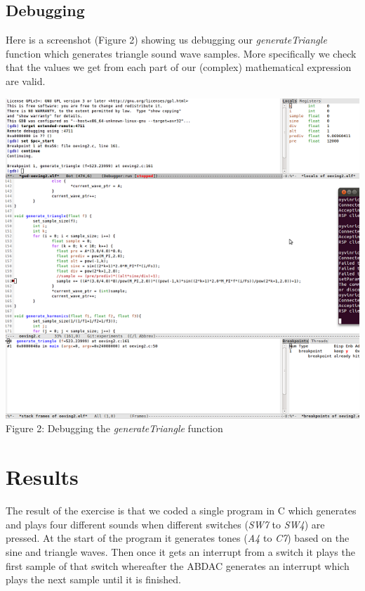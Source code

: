 \documentclass[a4paper,11pt]{article}
\begin{document}
\newpage

\subsection*{Debugging}
Here is a screenshot (Figure 2) showing us debugging our \emph{generateTriangle} function which generates triangle sound wave samples. More specifically we check that the values we get from each part of our (complex) mathematical expression are valid. 

\begin{center}

\includegraphics{images/debugsmall.png}
Figure 2: Debugging the \emph{generateTriangle} function
\end{center}

\section{Results}
The result of the exercise is that we coded a single program in C which generates and plays four different sounds when different switches (\emph{SW7} to \emph{SW4}) are pressed. At the start of the program it generates tones (\emph{A4} to \emph{C7}) based on the sine and triangle waves. Then once it gets an interrupt from a switch it plays the first sample of that switch whereafter the ABDAC generates an interrupt which plays the next sample until it is finished.
\end{document}
